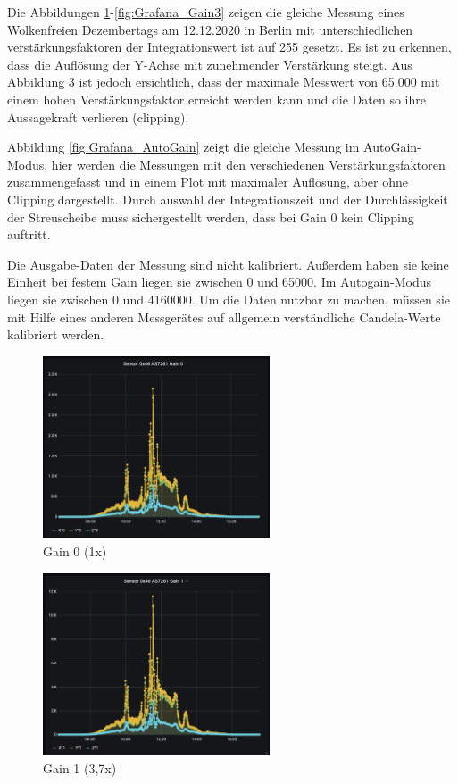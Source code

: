 Die Abbildungen \ref{fig:Grafana_Gain0}-\ref{fig:Grafana_Gain3} zeigen die gleiche Messung eines Wolkenfreien Dezembertags am 12.12.2020 in Berlin mit unterschiedlichen verstärkungsfaktoren der Integrationswert ist auf 255 gesetzt.
Es ist zu erkennen, dass die Auflösung der Y-Achse mit zunehmender Verstärkung steigt. Aus Abbildung 3 ist jedoch ersichtlich, dass der maximale Messwert von 65.000 mit einem hohen Verstärkungsfaktor erreicht werden kann und die Daten so ihre Aussagekraft verlieren (clipping).

Abbildung \ref{fig:Grafana_AutoGain} zeigt die gleiche Messung im AutoGain-Modus, hier werden die Messungen mit den verschiedenen Verstärkungsfaktoren zusammengefasst und in einem Plot mit maximaler Auflösung, aber ohne Clipping dargestellt.
Durch auswahl der Integrationszeit und der Durchlässigkeit der Streuscheibe muss sichergestellt werden, dass bei Gain 0 kein Clipping auftritt.

Die Ausgabe-Daten der Messung sind nicht kalibriert.
Außerdem haben sie keine Einheit bei festem Gain liegen sie zwischen 0 und 65000.
Im Autogain-Modus liegen sie zwischen 0 und 4160000.
Um die Daten nutzbar zu machen, müssen sie mit Hilfe eines anderen Messgerätes auf allgemein verständliche Candela-Werte kalibriert werden.

\begin{figure}[H]
\centering
\includegraphics[width=0.6\textwidth]{img/Grafana-Gain0}
\caption{Gain 0 (1x)}
\label{fig:Grafana_Gain0}
\end{figure}

\begin{figure}[H]
\centering
\includegraphics[width=0.6\textwidth]{img/Grafana-Gain1}
\caption{Gain 1 (3,7x)}
\label{fig:Grafana_Gain1}
\end{figure}


